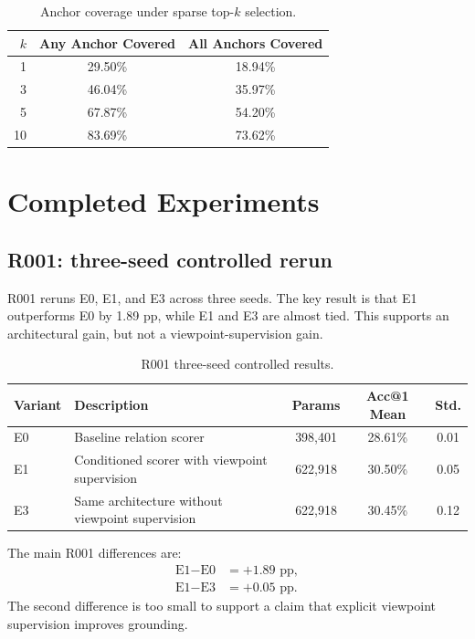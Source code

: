 \documentclass[11pt]{article}
\makeatletter
\newcommand{\acc}{Acc@1}
\newcommand{\pp}{pp}
\makeatother
\begin{document}
\begin{table}[t]
\centering
\small
\caption{Anchor coverage under sparse top-$k$ selection.}
\label{tab:coverage}
\begin{tabular}{rcc}
\toprule
$k$ & Any Anchor Covered & All Anchors Covered \\
\midrule
1 & 29.50\% & 18.94\% \\
3 & 46.04\% & 35.97\% \\
5 & 67.87\% & 54.20\% \\
10 & 83.69\% & 73.62\% \\
\bottomrule
\end{tabular}
\end{table}

\section{Completed Experiments}

\subsection{R001: three-seed controlled rerun}

R001 reruns E0, E1, and E3 across three seeds. The key result is that E1 outperforms E0 by 1.89 \pp{}, while E1 and E3 are almost tied. This supports an architectural gain, but not a viewpoint-supervision gain.

\begin{table}[t]
\centering
\small
\caption{R001 three-seed controlled results.}
\label{tab:r001}
\begin{tabular}{llccc}
\toprule
Variant & Description & Params & \acc{} Mean & Std. \\
\midrule
E0 & Baseline relation scorer & 398,401 & 28.61\% & 0.01 \\
E1 & Conditioned scorer with viewpoint supervision & 622,918 & 30.50\% & 0.05 \\
E3 & Same architecture without viewpoint supervision & 622,918 & 30.45\% & 0.12 \\
\bottomrule
\end{tabular}
\end{table}

The main R001 differences are:
\begin{align}
  \text{E1} - \text{E0} &= +1.89 \text{ \pp{}},\\
  \text{E1} - \text{E3} &= +0.05 \text{ \pp{}}.
\end{align}
The second difference is too small to support a claim that explicit viewpoint supervision improves grounding.
\end{document}
